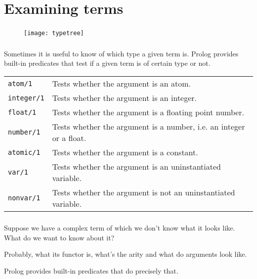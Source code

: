 \section{Examining terms}

\begin{frame}
	\frametitle{\insertsection}
	
	\begin{figure}
		\texttt{[image: typetree]}
	\end{figure}
\end{frame}


\begin{frame}
	\frametitle{\insertsection}
	
	Sometimes it is useful to know of which type a given term is. Prolog provides built-in predicates that test if a given term is of certain type or not.
	
	\begin{table}
		\centering
		\begin{tabular}{ l l }
			\rowcolor{LightGray} \texttt{atom/1} & Tests whether the argument is an atom. \\
			\rowcolor{LightGray} \texttt{integer/1} & Tests whether the argument is an integer. \\
			\rowcolor{LightGray} \texttt{float/1} & Tests whether the argument is a floating point number. \\
			\rowcolor{LightGray} \texttt{number/1} & Tests whether the argument is a number, i.e. an integer or a float. \\
			\rowcolor{LightGray} \texttt{atomic/1} & Tests whether the argument is a constant. \\
			\rowcolor{LightGray} \texttt{var/1} & Tests whether the argument is an uninstantiated variable. \\
			\rowcolor{LightGray} \texttt{nonvar/1} & Tests whether the argument is not an  uninstantiated variable.
		\end{tabular}
	\end{table}
\end{frame}


\begin{frame}
	\frametitle{\insertsection}
	
	Suppose we have a complex term of which we don't know what it looks like. What do we want to know about it?
	
	Probably, what its functor is, what's the arity and what do arguments look like.
	
	Prolog provides built-in predicates that do precisely that.
\end{frame}


